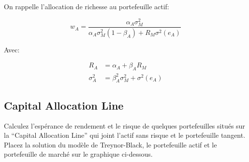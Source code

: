 \documentclass[
]{article}
\newenvironment{Shaded}{\begin{snugshade}}{\end{snugshade}}
\newcommand{\AttributeTok}[1]{\textcolor[rgb]{0.77,0.63,0.00}{#1}}
\newcommand{\ControlFlowTok}[1]{\textcolor[rgb]{0.13,0.29,0.53}{\textbf{#1}}}
\newcommand{\DecValTok}[1]{\textcolor[rgb]{0.00,0.00,0.81}{#1}}
\newcommand{\FloatTok}[1]{\textcolor[rgb]{0.00,0.00,0.81}{#1}}
\newcommand{\FunctionTok}[1]{\textcolor[rgb]{0.00,0.00,0.00}{#1}}
\newcommand{\NormalTok}[1]{#1}
\newcommand{\OtherTok}[1]{\textcolor[rgb]{0.56,0.35,0.01}{#1}}
\newcommand{\SpecialCharTok}[1]{\textcolor[rgb]{0.00,0.00,0.00}{#1}}
\newcommand{\StringTok}[1]{\textcolor[rgb]{0.31,0.60,0.02}{#1}}
\begin{document}
On rappelle l'allocation de richesse au portefeuille actif:

\[
w_A = \frac{\alpha_A \sigma^2_M}{\alpha_A \sigma^2_M (1-\beta_A) + R_M \sigma^2(e_A)}
\]

Avec:

\[
\begin{aligned}
R_A & = \alpha_A + \beta_A R_M \\
\sigma^2_A & = \beta^2_A \sigma^2_M + \sigma^2(e_A)
\end{aligned}
\]

\hypertarget{capital-allocation-line}{%
\subsection{Capital Allocation Line}\label{capital-allocation-line}}

Calculez l'espérance de rendement et le risque de quelques portefeuilles
situés sur la ``Capital Allocation Line'' qui joint l'actif sans risque
et le portefeuille tangent. Placez la solution du modèle de
Treynor-Black, le portefeuille actif et le portefeuille de marché sur le
graphique ci-dessous.

\begin{Shaded}
\end{Shaded}
\end{document}
